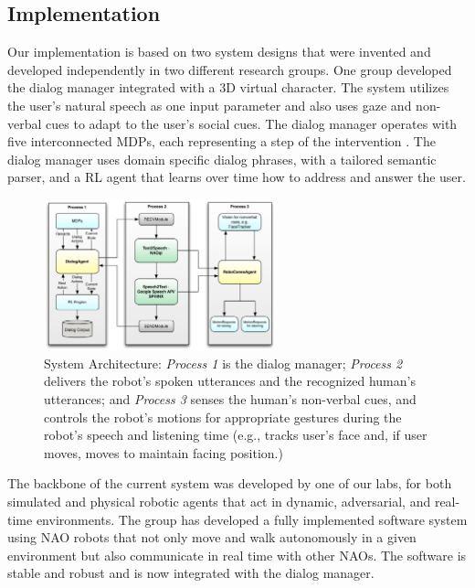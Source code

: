 \documentclass[letterpaper]{article}
\begin{document}
\begin{sloppy}
\section{Implementation} 

Our implementation is based on two system designs that were 
invented and developed independently in two different research groups. One  
group developed the dialog manager integrated with a 3D virtual 
character.  The system utilizes the user's natural speech as one input parameter and also uses gaze
and non-verbal cues to adapt to the user's social cues. The dialog manager  operates with five
interconnected MDPs, each representing a step of the intervention \cite{YASCLL14}. The dialog 
manager uses domain specific dialog phrases, with a tailored semantic parser, and a RL agent that 
learns over time how to address and answer the user. 


\begin{figure}[!t]
  \centering    
	\includegraphics[width=0.6\textwidth]{figures/system}
\caption{System Architecture: {\em Process 1} is the dialog manager; {\em Process 2} delivers the 
robot's spoken utterances and the recognized human's utterances; and {\em Process 3} senses the 
human's non-verbal cues, and controls the robot's motions for appropriate gestures during the 
robot's speech and listening time (e.g., tracks user's face and, if user moves, moves to maintain 
facing position.)} 
\label{fig:system} 
\end{figure}


The backbone of the current system was developed by one of our 
labs,
for both simulated and
physical robotic agents that act in dynamic, adversarial, and real-time environments.    
The group has developed a fully implemented software system  using NAO robots that not 
only move and walk autonomously in a given environment but 
also communicate in real time with other NAOs. The 
software is stable and
robust and is now integrated with the dialog manager.


\end{sloppy}
\end{document}
